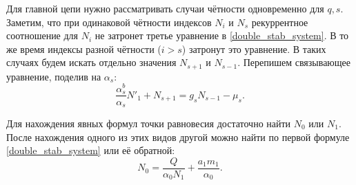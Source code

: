 Для главной цепи нужно рассматривать случаи чётности одновременно для \(q, s\). Заметим, что при одинаковой чётности индексов \(N_i\) и \(N_s\) рекуррентное соотношение для \(N_i\) не затронет третье уравнение в \eqref{double_stab_system}. В то же время индексы разной чётности (\(i > s\)) затронут это уравнение. В таких случаях будем искать отдельно значения \(N_{s+1}\) и \(N_{s-1}\). Перепишем связывающее уравнение, поделив на \(\alpha_s\):
\begin{equation*}
    \frac{\alpha^b_s}{\alpha_s} N'_1 + N_{s+1} = g_s N_{s-1} - \mu_{s}.
\end{equation*}

Для нахождения явных формул точки равновесия достаточно найти \(N_0\) или \(N_1\). После нахождения одного из этих видов другой можно найти по первой формуле \eqref{double_stab_system} или её обратной:
\begin{equation} \label{split_N0_from_N1}
    N_0 = \frac{Q}{\alpha_0 N_1} + \frac{a_1 m_1}{\alpha_0}.
\end{equation}

